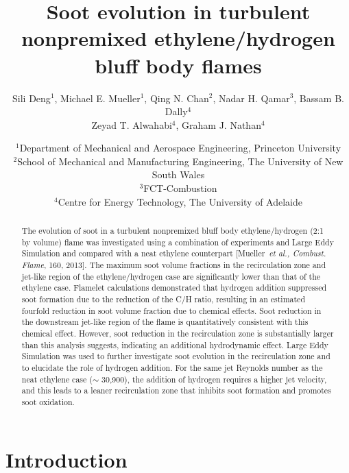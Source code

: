 \documentclass{essci}
\begin{document}
\title{ Soot evolution in turbulent nonpremixed ethylene/hydrogen bluff body flames }
\author{
%
Sili Deng$^1$, Michael E. Mueller$^1$, Qing N. Chan$^2$, Nadar H. Qamar$^3$, Bassam B. Dally$^4$ \\
Zeyad T. Alwahabi$^4$, Graham J. Nathan$^4$
%
}
\date{
%
$^1$Department of Mechanical and Aerospace Engineering, Princeton University \\
$^2$School of Mechanical and Manufacturing Engineering, The University of New South Wales \\
$^3$FCT-Combustion \\
$^4$Centre for Energy Technology, The University of Adelaide
%
}
\maketitle

\begin{abstract}
The evolution of soot in a turbulent nonpremixed bluff body ethylene/hydrogen (2:1 by volume) flame was investigated using a combination of experiments and Large Eddy Simulation and compared with a neat ethylene counterpart [Mueller~\emph{et al., Combust. Flame}, 160, 2013].  The maximum soot volume fractions in the recirculation zone and jet-like region of the ethylene/hydrogen case are significantly lower than that of the ethylene case.  Flamelet calculations demonstrated that hydrogen addition suppressed soot formation due to the reduction of the C/H ratio, resulting in an estimated fourfold reduction in soot volume fraction due to chemical effects.  Soot reduction in the downstream jet-like region of the flame is quantitatively consistent with this chemical effect.  However, soot reduction in the recirculation zone is substantially larger than this analysis suggests, indicating an additional hydrodynamic effect.  Large Eddy Simulation was used to further investigate soot evolution in the recirculation zone and to elucidate the role of hydrogen addition.  For the same jet Reynolds number as the neat ethylene case ($\sim$ 30,900), the addition of hydrogen requires a higher jet velocity, and this leads to a leaner recirculation zone that inhibits soot formation and promotes soot oxidation.
\end{abstract}


\section{Introduction}
\end{document}
